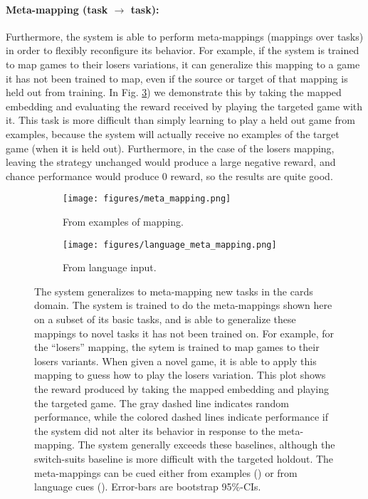 \documentclass{article}
\begin{document}
\paragraph{Meta-mapping (task $\rightarrow$ task):} Furthermore, the system is able to perform meta-mappings (mappings over tasks) in order to flexibly reconfigure its behavior. For example, if the system is trained to map games to their losers variations, it can generalize this mapping to a game it has not been trained to map, even if the source or target of that mapping is held out from training. In Fig. \ref{cards_meta_map_results}) we demonstrate this by taking the mapped embedding and evaluating the reward received by playing the targeted game with it. This task is more difficult than simply learning to play a held out game from examples, because the system will actually receive no examples of the target game (when it is held out). Furthermore, in the case of the losers mapping, leaving the strategy unchanged would produce a large negative reward, and chance performance would produce 0 reward, so the results are quite good. \par
\begin{figure}
\centering
\begin{subfigure}{0.5\textwidth}
\texttt{[image: figures/meta\_mapping.png]}
\caption{From examples of mapping.}
\label{cards_meta_map_results_examples}
\end{subfigure}%
\begin{subfigure}{0.5\textwidth}
\texttt{[image: figures/language\_meta\_mapping.png]}
\caption{From language input.}
\label{cards_meta_map_results_language}
\end{subfigure}
\caption{The system generalizes to meta-mapping new tasks in the cards domain. The system is trained to do the meta-mappings shown here on a subset of its basic tasks, and is able to generalize these mappings to novel tasks it has not been trained on. For example, for the ``losers'' mapping, the sytem is trained to map games to their losers variants. When given a novel game, it is able to apply this mapping to guess how to play the losers variation. This plot shows the reward produced by taking the mapped embedding and playing the targeted game. The gray dashed line indicates random performance, while the colored dashed lines indicate performance if the system did not alter its behavior in response to the meta-mapping. The system generally exceeds these baselines, although the switch-suits baseline is more difficult with the targeted holdout. The meta-mappings can be cued either from examples () or from language cues (). Error-bars are bootstrap 95\%-CIs.}
\label{cards_meta_map_results}
\end{figure}
\end{document}
